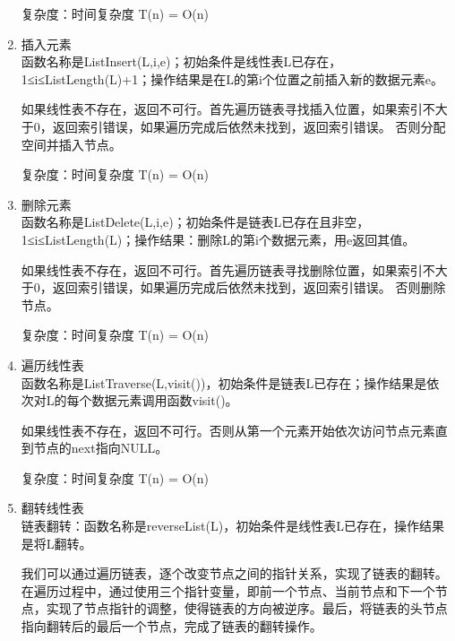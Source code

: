 \documentclass[supercite]{Experimental_Report}
\theoremstyle{definition}
\begin{document}
\begin{enumerate}
	复杂度：时间复杂度 T(n) = O(n)
	\item 插入元素\\
	函数名称是ListInsert(L,i,e)；初始条件是线性表L已存在，1≤i≤ListLength(L)+1；操作结果是在L的第i个位置之前插入新的数据元素e。
	
	如果线性表不存在，返回不可行。首先遍历链表寻找插入位置，如果索引不大于0，返回索引错误，如果遍历完成后依然未找到，返回索引错误。
	否则分配空间并插入节点。
	
	复杂度：时间复杂度 T(n) = O(n)
	\item 删除元素\\
	函数名称是ListDelete(L,i,e)；初始条件是链表L已存在且非空，1≤i≤ListLength(L)；操作结果：删除L的第i个数据元素，用e返回其值。
	
	如果线性表不存在，返回不可行。首先遍历链表寻找删除位置，如果索引不大于0，返回索引错误，如果遍历完成后依然未找到，返回索引错误。
	否则删除节点。
	
	复杂度：时间复杂度 T(n) = O(n)
	\item 遍历线性表\\
	函数名称是ListTraverse(L,visit())，初始条件是链表L已存在；操作结果是依次对L的每个数据元素调用函数visit()。
	
	如果线性表不存在，返回不可行。否则从第一个元素开始依次访问节点元素直到节点的next指向NULL。
	
	复杂度：时间复杂度 T(n) = O(n)
	\item 翻转线性表\\
	链表翻转：函数名称是reverseList(L)，初始条件是线性表L已存在，操作结果是将L翻转。
	
	我们可以通过遍历链表，逐个改变节点之间的指针关系，实现了链表的翻转。在遍历过程中，通过使用三个指针变量，即前一个节点、当前节点和下一个节点，实现了节点指针的调整，使得链表的方向被逆序。最后，将链表的头节点指向翻转后的最后一个节点，完成了链表的翻转操作。
	

\end{enumerate}
\end{document}
